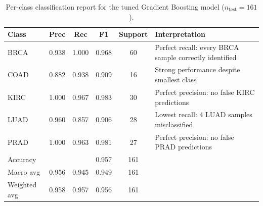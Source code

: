 \documentclass{article}
\begin{document}
\begin{table}[H]
\caption{Per-class classification report for the tuned Gradient Boosting model ($n_{\text{test}} = 161$).}
\label{tab:classreport}
\begin{center}
\begin{tabular}{lccccp{5.5cm}}
\toprule
\textbf{Class} & \textbf{Prec} & \textbf{Rec} & \textbf{F1} & \textbf{Support} & \textbf{Interpretation}\\
\midrule
BRCA & 0.938 & 1.000 & 0.968 & 60 & Perfect recall: every BRCA sample correctly identified\\
COAD & 0.882 & 0.938 & 0.909 & 16 & Strong performance despite smallest class\\
KIRC & 1.000 & 0.967 & 0.983 & 30 & Perfect precision: no false KIRC predictions\\
LUAD & 0.960 & 0.857 & 0.906 & 28 & Lowest recall: 4 LUAD samples misclassified\\
PRAD & 1.000 & 0.963 & 0.981 & 27 & Perfect precision: no false PRAD predictions\\
\midrule
Accuracy & & & 0.957 & 161 & \\
Macro avg & 0.956 & 0.945 & 0.949 & 161 & \\
Weighted avg & 0.958 & 0.957 & 0.956 & 161 & \\
\bottomrule
\end{tabular}
\end{center}
\end{table}
\end{document}
